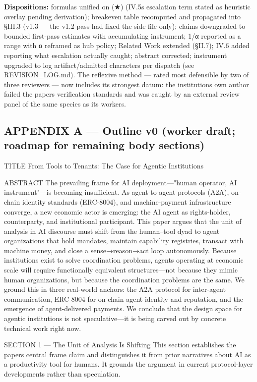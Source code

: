 \documentclass[
]{article}
\begin{document}
\textbf{Dispositions:} formulas unified on (★) (IV.5\textquotesingle s
escalation term stated as heuristic overlay pending derivation);
breakeven table recomputed and propagated into §III.3 (v1.3 --- the v1.2
pass had fixed the side file only); claims downgraded to bounded
first-pass estimates with accumulating instrument; 1/α reported as a
range with α reframed as hub policy; Related Work extended (§II.7); IV.6
added reporting what escalation actually caught; abstract corrected;
instrument upgraded to log artifact/admitted characters per dispatch
(see REVISION\_LOG.md). The reflexive method --- rated most defensible
by two of three reviewers --- now includes its strongest datum: the
institution\textquotesingle s own author failed the
paper\textquotesingle s verification standards and was caught by an
external review panel of the same species as its workers.

\subsection{APPENDIX A --- Outline v0 (worker draft; roadmap for
remaining body
sections)}\label{appendix-a--outline-v0-worker-draft-roadmap-for-remaining-body-sections}

TITLE From Tools to Tenants: The Case for Agentic Institutions

ABSTRACT The prevailing frame for AI deployment---"human operator, AI
instrument"---is becoming insufficient. As agent-to-agent protocols
(A2A), on-chain identity standards (ERC-8004), and machine-payment
infrastructure converge, a new economic actor is emerging: the AI agent
as rights-holder, counterparty, and institutional participant. This
paper argues that the unit of analysis in AI discourse must shift from
the human--tool dyad to agent organizations that hold mandates, maintain
capability registries, transact with machine money, and close a
sense→reason→act loop autonomously. Because institutions exist to solve
coordination problems, agents operating at economic scale will require
functionally equivalent structures---not because they mimic human
organizations, but because the coordination problems are the same. We
ground this in three real-world anchors: the A2A protocol for
inter-agent communication, ERC-8004 for on-chain agent identity and
reputation, and the emergence of agent-delivered payments. We conclude
that the design space for agentic institutions is not speculative---it
is being carved out by concrete technical work right now.

SECTION 1 --- The Unit of Analysis Is Shifting This section establishes
the paper\textquotesingle s central frame claim and distinguishes it
from prior narratives about AI as a productivity tool for humans. It
grounds the argument in current protocol-layer developments rather than
speculation.
\end{document}
